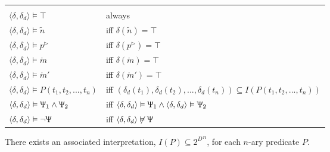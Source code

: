 \noindent
\begin{tabular}{m{4cm}l}
  &\\
  $\langle \delta, \delta_d \rangle \vDash \top $&always\\
  $\langle \delta, \delta_d \rangle \vDash \tilde{n} $& iff $\delta(\tilde{n})=\top$\\
  $\langle \delta, \delta_d \rangle \vDash p^\triangleright$& iff $\delta(p^\triangleright)=\top$\\
  $\langle \delta, \delta_d \rangle \vDash \mathring{m}$& iff $\delta(\mathring{m})=\top$\\
  $\langle \delta, \delta_d \rangle \vDash \mathring{m}'$&iff $\delta(\mathring{m}')=\top$\\
%  
  $\langle \delta, \delta_d \rangle \vDash P(t_1, t_2, ..., t_n)$&iff $(\delta_d(t_1), \delta_d(t_2),..., \delta_d(t_n)) \subseteq I(P(t_1, t_2, ..., t_n))$\\
  $\langle \delta, \delta_d \rangle \vDash \Uppsi_1 \wedge \Uppsi_2$&iff $\langle \delta, \delta_d \rangle \vDash \Uppsi_1 \wedge \langle \delta, \delta_d \rangle \vDash \Uppsi_2$\\ $\langle \delta , \delta_d \rangle \vDash \neg \Uppsi$ & iff $\langle \delta , \delta_d \rangle \not \vDash \Uppsi$ \\
\end{tabular} 

There exists an associated interpretation, $I(P) \subseteq {2^{D}}^n$, for each $n$-ary predicate $P$. %

